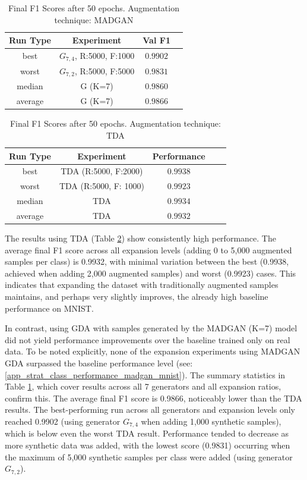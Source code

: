 \begin{table}[H]
	\vspace{-1.5em}
	\centering
	\begin{tabular}{|c|c|c|c|}
		\hline
		Run Type & Experiment & Val F1 \\ \hline
		best & \(G_{7, 4}\), R:5000, F:1000 & $0.9902$\\ \hline
		worst & \(G_{7, 2}\), R:5000, F:5000 & $0.9831$\\ \hline
		median & G (K=7) & $0.9860$\\ \hline
		average & G (K=7) & $0.9866$
		\\ \hline
	\end{tabular}
    \caption{Final F1 Scores after 50 epochs. Augmentation technique: MADGAN}
        \label{tab:res_expansion_mnist_tda_vs_madgan__madgan}
\end{table}
\begin{table}[H]
	\centering
	\vspace{-1.5em}
	\begin{tabular}{|c|c|c|c|c|}
		\hline
		Run Type & Experiment & Performance \\ \hline
		best & TDA (R:5000, F:2000) & $0.9938$\\ \hline
		worst & TDA (R:5000, F: 1000) & $0.9923$\\ \hline
		median & TDA & $0.9934$\\ \hline
		average & TDA & $0.9932$
		\\ \hline
	\end{tabular}
    \caption{Final F1 Scores after 50 epochs. Augmentation technique: TDA}
        \label{tab:res_expansion_mnist_tda_vs_madgan__tda}
\end{table}

The results using TDA (Table \ref{tab:res_expansion_mnist_tda_vs_madgan__tda}) show consistently high performance. The average final F1 score across all expansion levels (adding 0 to 5,000 augmented samples per class) is 0.9932, with minimal variation between the best (0.9938, achieved when adding 2,000 augmented samples) and worst (0.9923) cases. This indicates that expanding the dataset with traditionally augmented samples maintains, and perhaps very slightly improves, the already high baseline performance on MNIST.

In contrast, using GDA with samples generated by the MADGAN (K=7) model did not yield performance improvements over the baseline trained only on real data. To be noted explicitly, none of the expansion experiments using MADGAN GDA surpassed the baseline performance level (see: \ref{app_strat_class_performance_madgan_mnist}). The summary statistics in Table \ref{tab:res_expansion_mnist_tda_vs_madgan__madgan}, which cover results across all 7 generators and all expansion ratios, confirm this. The average final F1 score is 0.9866, noticeably lower than the TDA results. The best-performing run across all generators and expansion levels only reached 0.9902 (using generator \(G_{7,4}\) when adding 1,000 synthetic samples), which is below even the worst TDA result. Performance tended to decrease as more synthetic data was added, with the lowest score (0.9831) occurring when the maximum of 5,000 synthetic samples per class were added (using generator \(G_{7,2}\)).

